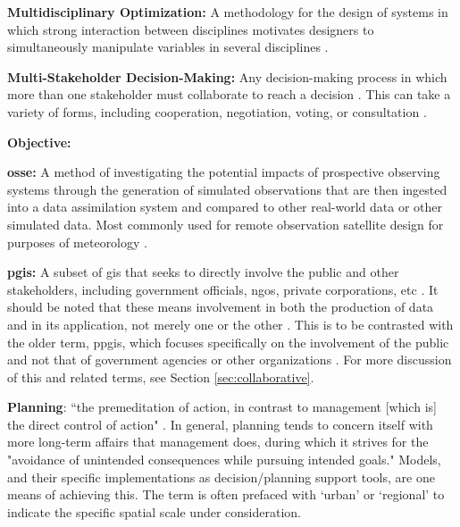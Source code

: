 \textbf{Multidisciplinary Optimization:} A methodology for the design of systems in which strong interaction between disciplines motivates designers to simultaneously manipulate variables in several disciplines \cite{sobieszczanski-sobieskiMultidisciplinaryAerospaceDesign1997}.

\textbf{Multi-Stakeholder Decision-Making:} Any decision-making process in which more than one stakeholder must collaborate to reach a decision \cite{fitzgeraldRecommendationsFramingMultistakeholder2016}. This can take a variety of forms, including cooperation, negotiation, voting, or consultation \cite{garberMultiStakeholderTradeSpace2015}.

\textbf{Objective:}

\textbf{\acf{osse}:} A method of investigating the potential impacts of prospective observing systems through the generation of simulated observations that are then ingested into a data assimilation system and compared to other real-world data or other simulated data. Most commonly used for remote observation satellite design for purposes of meteorology \cite{masutaniObservingSystemSimulation2010} .


\textbf{\acf{pgis}:} A subset of \ac{gis} that seeks to directly involve the public and other stakeholders, including government officials, \acp{ngo}, private corporations, etc \cite{sieberPublicParticipationGeographic2006}. It should be noted that these means involvement in both the production of data and in its application, not merely one or the other \cite{weinerParticipatoryGeographicInformation2007, talenBottomUpGIS2000}. This is to be contrasted with the older term, \ac{ppgis}, which focuses specifically on the involvement of the public and not that of government agencies or other organizations \cite{sieberPublicParticipationGeographic2006}. For more discussion of this and related terms, see Section \ref{sec:collaborative}.

\textbf{Planning}: ``the premeditation of action, in contrast to management [which is] the direct control of action" \cite{harrisLocationalModelsGeographic1993}. In general, planning tends to concern itself with more long-term affairs that management does, during which it strives for the "avoidance of unintended consequences while pursuing intended goals." Models, and their specific implementations as decision/planning support tools, are one means of achieving this. The term is often prefaced with `urban' or `regional' to indicate the specific spatial scale under consideration.

